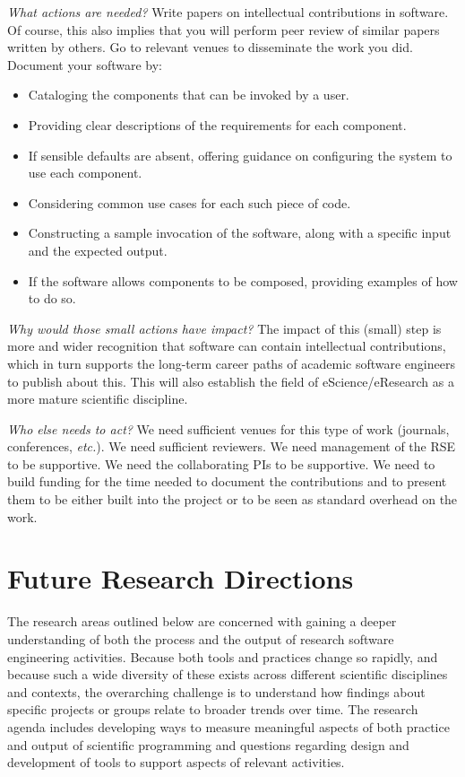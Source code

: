 \documentclass[a4paper,UKenglish]{dagman}
\newcommand{\etc}{\emph{etc.}\xspace}
\begin{document}
\emph{What actions are needed?}
Write papers on intellectual contributions in software. Of course, this also implies that you will perform peer review of similar papers written by others. Go to relevant venues to disseminate the work you did.
Document your software by:
\begin{itemize}
\item Cataloging the components that can be invoked by a user.
\item Providing clear descriptions of the requirements for each component.
\item If sensible defaults are absent, offering guidance on configuring the system to use each component.
\item Considering common use cases for each such piece of code.
\item Constructing a sample invocation of the software, along with a specific input and the expected output.
\item If the software allows components to be composed, providing examples of how to do so.
\end{itemize}


\emph{Why would those small actions have impact?}
The impact of this (small) step is more and wider recognition that software can contain intellectual contributions, which in turn supports the long-term career paths of academic software engineers to publish about this. This will also establish the field of eScience/eResearch as a more mature scientific discipline.

\emph{Who else needs to act?}
We need sufficient venues for this type of work (journals, conferences, \etc).  We need sufficient reviewers.  We need management of the RSE to be supportive.  We need the collaborating PIs to be supportive.  We need to build funding for the time needed to document the contributions and to present them to be either built into the project or to be seen as standard overhead on the work.

\newpage
\section{Future Research Directions}

The research areas outlined below are concerned with gaining a deeper understanding of both the process and the output of research software engineering activities. Because both tools and practices change so rapidly, and because such a wide diversity of these exists across different scientific disciplines and contexts, the overarching challenge is to understand how findings about specific projects or groups relate to broader trends over time. The research agenda includes developing ways to measure meaningful aspects of both practice and output of scientific programming and questions regarding design and development of tools to support aspects of relevant activities.
\end{document}

